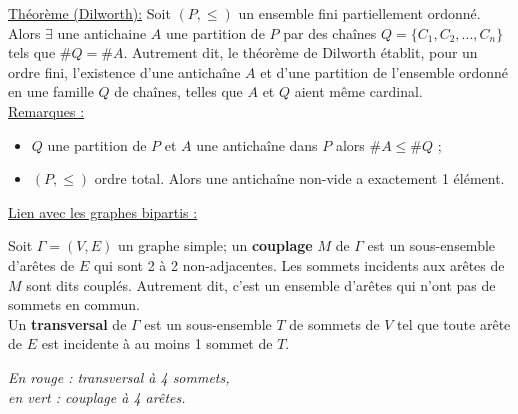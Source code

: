 \documentclass[11pt]{article}
\begin{document}
		\underline{Théorème (Dilworth):} Soit $(P,\leq)$ un ensemble fini partiellement ordonné. Alors $\exists$ une antichaine $A$ une partition de $P$ par des chaînes $Q=\{C_1,C_2,...,C_n\}$ tels que $\#Q=\#A$. Autrement dit, le théorème de Dilworth établit, pour un ordre fini, l'existence d'une antichaîne $A$ et d'une partition de l'ensemble ordonné en une famille $Q$ de chaînes, telles que $A$ et $Q$ aient même cardinal.\\
		
		\underline{Remarques :}
		\begin{itemize}
			\item $Q$ une partition de $P$ et $A$ une antichaîne dans $P$ alors $\#A \leq \#Q$ ;
			\item $(P,\leq)$ ordre total. Alors une antichaîne non-vide a exactement 1 élément.
		\end{itemize}

		\underline{Lien avec les graphes bipartis :}
		
		Soit $\Gamma=(V,E)$ un graphe simple; un \textbf{couplage} $M$ de $\Gamma$ est un sous-ensemble d'arêtes de $E$ qui sont 2 à 2 non-adjacentes. Les sommets incidents aux arêtes de $M$ sont dits couplés. Autrement dit, c'est un ensemble d'arêtes qui n'ont pas de sommets en commun.\\
		
		Un \textbf{transversal} de $\Gamma$ est un sous-ensemble $T$ de sommets de $V$ tel que toute arête de $E$ est incidente à au moins 1 sommet de $T$.\\
			
		\begin{minipage}{0.5\textwidth}
            		\centering
            			\end{minipage}\hfill
            			\begin{minipage}{0.5\textwidth}
            			\centering
			 	\textit{En rouge : transversal à 4 sommets,\\
            			en vert : couplage à 4 arêtes.}
            	\end{minipage}\\
\end{document}
